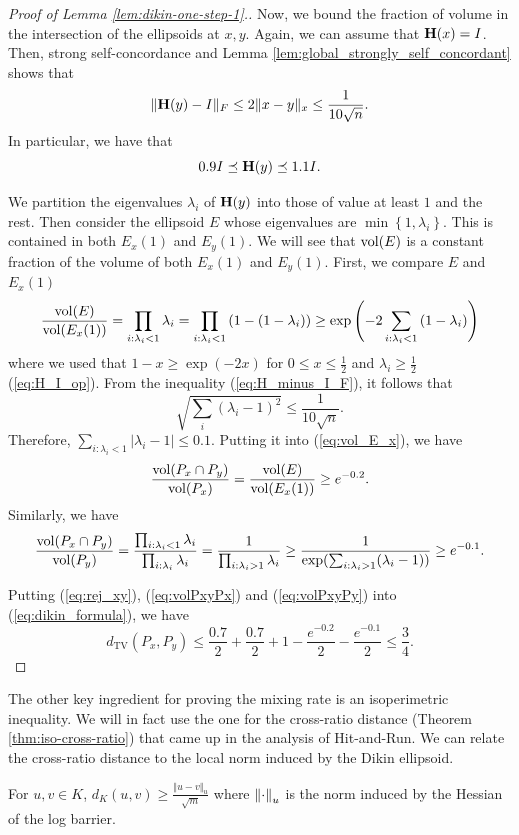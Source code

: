 \begin{proof}[Proof of Lemma \ref{lem:dikin-one-step-1}.]
Now, we bound the fraction of volume in the intersection of the ellipsoids
at $x,y$. Again, we can assume that $\mathbf{H}(x)=I$. Then, strong self-concordance
and Lemma \ref{lem:global_strongly_self_concordant} shows that
\begin{equation}
\|\mathbf{H}(y)-I\|_{F}\leq2\|x-y\|_{x}\leq\frac{1}{10\sqrt{n}}.\label{eq:H_minus_I_F}
\end{equation}
In particular, we have that 
\begin{equation}
0.9I\preceq\mathbf{H}(y)\preceq1.1I.\label{eq:H_I_op}
\end{equation}

We partition the eigenvalues $\lambda_{i}$ of $\mathbf{H}(y)$ into those
of value at least $1$ and the rest. Then consider the ellipsoid $E$
whose eigenvalues are $\min\left\{ 1,\lambda_{i}\right\} $. This
is contained in both $E_{x}(1)$ and $E_{y}(1)$. We will see that
$\mathrm{vol}(E)$ is a constant fraction of the volume of both $E_{x}(1)$
and $E_{y}(1)$. First, we compare $E$ and $E_{x}(1)$
\begin{equation}
\frac{\mathrm{vol}(E)}{\mathrm{vol}(E_{x}(1))}=\prod_{i:\lambda_{i}<1}\lambda_{i}=\prod_{i:\lambda_{i}<1}\left(1-(1-\lambda_{i})\right)\geq\exp\left(-2\sum_{i:\lambda_{i}<1}\left(1-\lambda_{i}\right)\right)\label{eq:vol_E_x}
\end{equation}
where we used that $1-x\geq\exp(-2x)$ for $0\leq x\leq\frac{1}{2}$
and $\lambda_{i}\geq\frac{1}{2}$ (\ref{eq:H_I_op}). From the inequality
(\ref{eq:H_minus_I_F}), it follows that
\[
\sqrt{\sum_{i}(\lambda_{i}-1)^{2}}\le\frac{1}{10\sqrt{n}}.
\]
Therefore, $\sum_{i:\lambda_{i}<1}|\lambda_{i}-1|\leq0.1$. Putting
it into (\ref{eq:vol_E_x}), we have
\begin{equation}
\frac{\mathrm{vol}(P_{x}\cap P_{y})}{\mathrm{vol}(P_{x})}=\frac{\mathrm{vol}(E)}{\mathrm{vol}(E_{x}(1))}\geq e^{-0.2}.\label{eq:volPxyPx}
\end{equation}
Similarly, we have
\begin{equation}
\frac{\mathrm{vol}(P_{x}\cap P_{y})}{\mathrm{vol}(P_{y})}=\frac{\prod_{i:\lambda_{i}<1}\lambda_{i}}{\prod_{i:\lambda_{i}}\lambda_{i}}=\frac{1}{\prod_{i:\lambda_{i}>1}\lambda_{i}}\geq\frac{1}{\exp(\sum_{i:\lambda_{i}>1}(\lambda_{i}-1))}\geq e^{-0.1}.\label{eq:volPxyPy}
\end{equation}

Putting (\ref{eq:rej_xy}), (\ref{eq:volPxyPx}) and (\ref{eq:volPxyPy})
into (\ref{eq:dikin_formula}), we have
\[
d_{\mathrm{TV}}(P_{x},P_{y})\leq\frac{0.7}{2}+\frac{0.7}{2}+1-\frac{e^{-0.2}}{2}-\frac{e^{-0.1}}{2}\leq\frac{3}{4}.
\]
\end{proof}
The other key ingredient for proving the mixing rate is an isoperimetric
inequality. We will in fact use the one for the cross-ratio distance
(Theorem \ref{thm:iso-cross-ratio}) that came up in the analysis
of Hit-and-Run. We can relate the cross-ratio distance to the local
norm induced by the Dikin ellipsoid.
\begin{lem}
\label{lem:dikin-dist-1}For $u,v\in K$, $d_{K}(u,v)\ge\frac{\Vert u-v\Vert_{u}}{\sqrt{m}}$
where $\left\Vert \cdot\right\Vert_{u}$ is the norm induced by the Hessian of the
log barrier. 
\end{lem}

